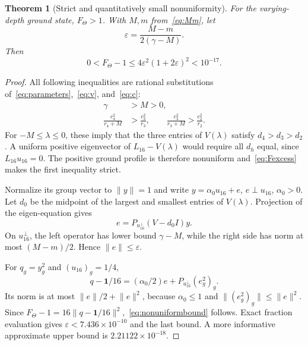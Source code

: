 \documentclass[journal,a4paper,10pt]{IEEEtran}
\newtheorem{theorem}{Theorem}
\theoremstyle{definition}\newtheorem{definition}[theorem]{Definition}
\theoremstyle{remark}\newtheorem{remark}[theorem]{Remark}
\newcommand{\one}{\mathbf 1}
\newcommand{\norm}[1]{\lVert #1\rVert}
\newcommand{\eps}{\varepsilon}
\begin{document}
\begin{theorem}[Strict and quantitatively small nonuniformity]\label{thm:nonuniform}
For the varying-depth ground state, $F_\Theta>1$. With $M,m$ from~\eqref{eq:Mm}, let
\begin{equation}
\eps=\frac{M-m}{2(\gamma-M)}.
\end{equation}
Then
\begin{equation}\label{eq:nonuniformbound}
0<F_\Theta-1\leq4\eps^2(1+2\eps)^2<10^{-17}.
\end{equation}
\end{theorem}
\begin{proof}
All following inequalities are rational substitutions of~\eqref{eq:parameters},~\eqref{eq:v}, and~\eqref{eq:c}:
\begin{align}
\gamma&>M>0,\nonumber\\
\frac{c_4^2}{r_4+M}&>\frac{c_3^2}{r_3},\qquad
\frac{c_3^2}{r_3+M}>\frac{c_2^2}{r_2}.\label{eq:strictpotential}
\end{align}
For $-M\leq\lambda\leq0$, these imply that the three entries of $V(\lambda)$ satisfy $d_4>d_3>d_2$. A uniform positive eigenvector of $L_{16}-V(\lambda)$ would require all $d_h$ equal, since $L_{16}u_{16}=0$. The positive ground profile is therefore nonuniform and~\eqref{eq:Fexcess} makes the first inequality strict.

Normalize its group vector to $\norm y=1$ and write $y=\alpha_0u_{16}+e$, $e\perp u_{16}$, $\alpha_0>0$. Let $d_0$ be the midpoint of the largest and smallest entries of $V(\lambda)$. Projection of the eigen-equation gives
\begin{equation}
[L_{16}-(\lambda+d_0)I]e=P_{u_{16}^\perp}(V-d_0I)y.
\end{equation}
On $u_{16}^\perp$, the left operator has lower bound $\gamma-M$, while the right side has norm at most $(M-m)/2$. Hence $\norm e\leq\eps$.

For $q_g=y_g^2$ and $(u_{16})_g=1/4$,
\begin{equation}
q-\one/16=(\alpha_0/2)e+
P_{u_{16}^\perp}(e_g^2)_g.
\end{equation}
Its norm is at most $\norm e/2+\norm e^2$, because $\alpha_0\leq1$ and $\norm{(e_g^2)_g}\leq\norm e^2$. Since $F_\Theta-1=16\norm{q-\one/16}^2$,~\eqref{eq:nonuniformbound} follows. Exact fraction evaluation gives $\eps<7.436\times10^{-10}$ and the last bound. A more informative approximate upper bound is $2.21122\times10^{-18}$.
\end{proof}
\end{document}

